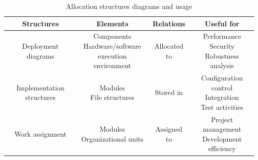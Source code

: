\begin{table}[H]
    \centering
    \begin{tabular}{|c|ccc|}
    \hline
    \textbf{Structures}         & \textbf{Elements}                                                         & \textbf{Relations}    & \textbf{Useful for}                                                   \\ \hline
    Deployment diagrams         & \makecell{Components\\Hardware/software\\execution environment}       & Allocated to          & \makecell{Performance\\Security\\Robustness analysis}                 \\ \hline
    Implementation structures   & \makecell{Modules\\File structures}                                       & Stored in             & \makecell{Configuration control\\Integration\\Test activities}        \\ \hline
    Work assignment             & \makecell{Modules\\Organizational units}                                  & Assigned to           & \makecell{Project management\\Development efficiency}                 \\ \hline
    \end{tabular}
    \caption{Allocation structures diagrams and usage}
\end{table}